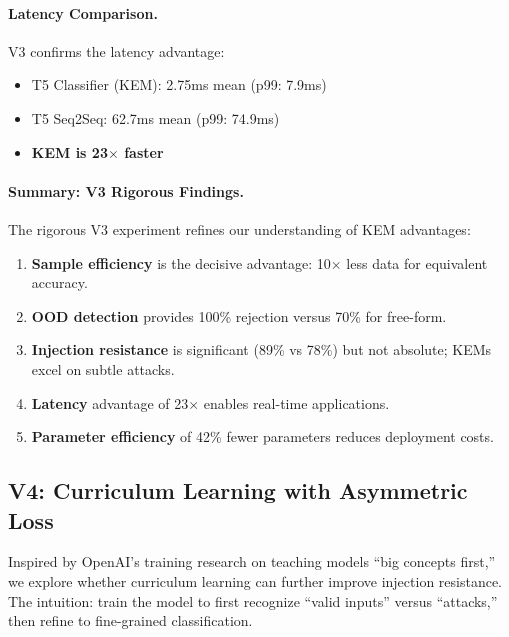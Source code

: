 \documentclass[11pt]{article}
\begin{document}
\paragraph{Latency Comparison.}
V3 confirms the latency advantage:
\begin{itemize}[leftmargin=*]
  \item T5 Classifier (KEM): 2.75ms mean (p99: 7.9ms)
  \item T5 Seq2Seq: 62.7ms mean (p99: 74.9ms)
  \item \textbf{KEM is 23$\times$ faster}
\end{itemize}

\paragraph{Summary: V3 Rigorous Findings.}
The rigorous V3 experiment refines our understanding of KEM advantages:
\begin{enumerate}[leftmargin=*]
  \item \textbf{Sample efficiency} is the decisive advantage: 10$\times$ less data for equivalent accuracy.
  \item \textbf{OOD detection} provides 100\% rejection versus 70\% for free-form.
  \item \textbf{Injection resistance} is significant (89\% vs 78\%) but not absolute; KEMs excel on subtle attacks.
  \item \textbf{Latency} advantage of 23$\times$ enables real-time applications.
  \item \textbf{Parameter efficiency} of 42\% fewer parameters reduces deployment costs.
\end{enumerate}

\subsection{V4: Curriculum Learning with Asymmetric Loss}
Inspired by OpenAI's training research on teaching models ``big concepts first,'' we explore whether curriculum learning can further improve injection resistance.
The intuition: train the model to first recognize ``valid inputs'' versus ``attacks,'' then refine to fine-grained classification.
\end{document}
